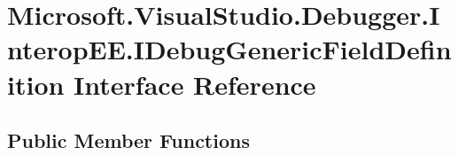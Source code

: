 \hypertarget{interface_microsoft_1_1_visual_studio_1_1_debugger_1_1_interop_e_e_1_1_i_debug_generic_field_definition}{\section{Microsoft.\+Visual\+Studio.\+Debugger.\+Interop\+E\+E.\+I\+Debug\+Generic\+Field\+Definition Interface Reference}
\label{interface_microsoft_1_1_visual_studio_1_1_debugger_1_1_interop_e_e_1_1_i_debug_generic_field_definition}
}
\subsection*{Public Member Functions}
